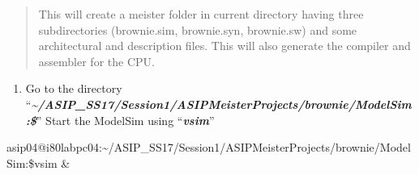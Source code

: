 \documentclass[
]{article}
\begin{document}
\begin{quote}
This will create a meister folder in current directory having three
subdirectories (brownie.sim, brownie.syn, brownie.sw) and some
architectural and description files. This will also generate the
compiler and assembler for the CPU.
\end{quote}

\begin{enumerate}
\def\labelenumi{\arabic{enumi}.}
\setcounter{enumi}{8}
\item
  Go to the directory
  ``\emph{\textbf{\textasciitilde/ASIP\_SS17/Session1/ASIPMeisterProjects/brownie/ModelSim:\$}}''
  Start the ModelSim using ``\emph{\textbf{vsim}}''
\end{enumerate}

asip04@i80labpc04:\textasciitilde/ASIP\_SS17/Session1/ASIPMeisterProjects/brownie/ModelSim:\$vsim
\&
\end{document}

